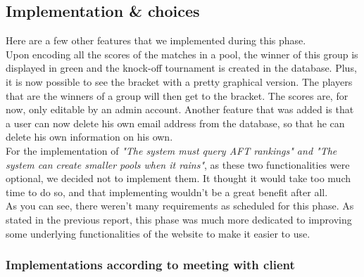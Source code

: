 \documentclass[a4paper, 12pt]{article}
\begin{document}
\subsection{Implementation \& choices}

Here are a few other features that we implemented during this phase. \\

Upon encoding all the scores of the matches in a pool, the winner of this group is displayed in green and the knock-off tournament is created in the database. Plus, it is now possible to see the bracket with a pretty graphical version. The players that are the winners of a group will then get to the bracket. The scores are, for now, only editable by an admin account. Another feature that was added is that a user can now delete his own email address from the database, so that he can delete his own information on his own.\\

For the implementation of \textit{"The system must query AFT rankings" and "The system can create smaller pools when it rains"}, as these two functionalities were optional, we decided not to implement them. It thought it would take too much time to do so, and that implementing wouldn't be a great benefit after all.\\

As you can see, there weren't many requirements as scheduled for this phase. As stated in the previous report, this phase was much more dedicated to improving some underlying functionalities of the website to make it easier to use.

\subsubsection*{Implementations according to meeting with client}
\end{document}
